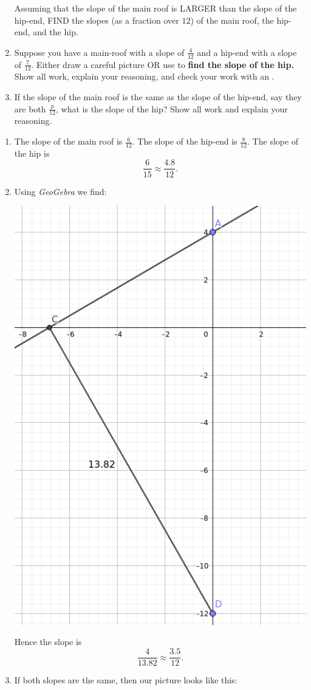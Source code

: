 \documentclass[hints,nooutcomes,noauthor,handout]{ximera}
\begin{document}
\begin{question}
\begin{enumerate}
\begin{center}
    \end{center}
    Assuming that the slope of the main roof is LARGER than the slope
    of the hip-end, FIND the slopes (as a fraction over $12$) of the main roof, the hip-end, and
    the hip. 
  \item Suppose you have a main-roof with a slope of $\frac{4}{12}$
    and a hip-end with a slope of $\frac{7}{12}$. Either draw a
    careful picture OR use
     to
    \textbf{find the slope of the hip.}  Show all work, explain your
    reasoning, and check your work with an .
  \item If the slope of the main roof is the same as the slope of the
    hip-end, say they are both $\frac{p}{12}$, what is the slope of
    the hip? Show all work and explain your reasoning.
  \end{enumerate}
  \begin{freeResponse}
    \begin{enumerate}
    \item The slope of the main roof is $\frac{6}{12}$. The slope of
      the hip-end is $\frac{8}{12}$. The slope of the hip is
      \[
      \frac{6}{15} \approx \frac{4.8}{12}.
      \]
    \item Using \textit{GeoGebra} we find:
      \begin{center}
        \includegraphics[width=.3\textwidth]{workUnEqSlope.png}
      \end{center}
      Hence the slope is
      \[
      \frac{4}{13.82} \approx \frac{3.5}{12}.
      \]
    \item If both slopes are the same, then our picture looks like
      this:
      \begin{center}
        \begin{tikzpicture}[geometryDiagrams,scale=.2]


\end{tikzpicture}
\end{center}
\end{enumerate}
\end{freeResponse}
\end{question}
\end{document}
